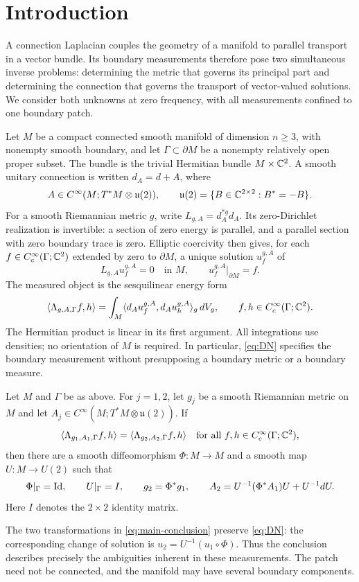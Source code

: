 \section{Introduction}\label{sec:intro}
A connection Laplacian couples the geometry of a manifold to parallel
transport in a vector bundle. Its boundary measurements therefore pose
two simultaneous inverse problems: determining the metric that governs
its principal part and determining the connection that governs the
transport of vector-valued solutions. We consider both unknowns at zero
frequency, with all measurements confined to one boundary patch.

Let $M$ be a compact connected smooth manifold of dimension $n\geq3$,
with nonempty smooth boundary, and let $\Gamma\subset\partial M$ be a
nonempty relatively open proper subset. The bundle is the trivial
Hermitian bundle $M\times\mathbb C^2$. A smooth unitary connection is written
$d_A=d+A$, where
\[
 A\in C^\infty(M;T^*M\otimes\mathfrak u(2)),\qquad
 \mathfrak u(2)=\{B\in\mathbb C^{2\times2}:B^*=-B\}.
\]
For a smooth Riemannian metric $g$, write
$L_{g,A}=d_A^{*g}d_A$. Its zero-Dirichlet realization is invertible:
a section of zero energy is parallel, and a parallel section with zero
boundary trace is zero. Elliptic coercivity then gives, for each
$f\in C_c^\infty(\Gamma;\mathbb C^2)$ extended by zero to $\partial M$, a unique
solution $u_f^{g,A}$ of
\[
 L_{g,A}u_f^{g,A}=0\quad\text{in }M,\qquad
 u_f^{g,A}|_{\partial M}=f.
\]
The measured object is the sesquilinear energy form
\begin{equation}\label{eq:DN}
 \langle\Lambda_{g,A,\Gamma}f,h\rangle
 =\int_M\langle d_Au_f^{g,A},d_Au_h^{g,A}\rangle_g\,dV_g,
 \qquad f,h\in C_c^\infty(\Gamma;\mathbb C^2).
\end{equation}
The Hermitian product is linear in its first argument. All integrations
use densities; no orientation of $M$ is required. In particular,
\eqref{eq:DN} specifies the boundary measurement without presupposing a
boundary metric or a boundary measure.

\begin{theorem}\label{thm:main}
Let $M$ and $\Gamma$ be as above. For $j=1,2$, let $g_j$ be a smooth
Riemannian metric on $M$ and let
$A_j\in C^\infty(M;T^*M\otimes\mathfrak u(2))$. If
\[
 \langle\Lambda_{g_1,A_1,\Gamma}f,h\rangle
 =\langle\Lambda_{g_2,A_2,\Gamma}f,h\rangle
 \quad\text{for all }f,h\in C_c^\infty(\Gamma;\mathbb C^2),
\]
then there are a smooth diffeomorphism $\Phi:M\longrightarrow M$ and
a smooth map $U:M\longrightarrow U(2)$ such that
\begin{equation}\label{eq:main-conclusion}
 \Phi|_\Gamma=\operatorname{Id},\qquad U|_\Gamma=I,\qquad
 g_2=\Phi^*g_1,\qquad
 A_2=U^{-1}(\Phi^*A_1)U+U^{-1}dU.
\end{equation}
Here $I$ denotes the $2\times2$ identity matrix.
\end{theorem}
The two transformations in \eqref{eq:main-conclusion} preserve
\eqref{eq:DN}: the corresponding change of solution is
$u_2=U^{-1}(u_1\circ\Phi)$. Thus the conclusion describes precisely the
ambiguities inherent in these measurements. The patch need not be
connected, and the manifold may have several boundary components.

